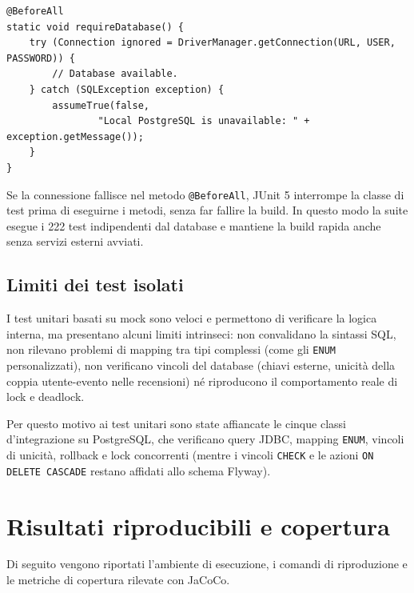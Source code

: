 \begin{lstlisting}[caption={Controllo di disponibilità del database tramite \texttt{Assumptions}.}, label={lst:assume-database}]
@BeforeAll
static void requireDatabase() {
    try (Connection ignored = DriverManager.getConnection(URL, USER, PASSWORD)) {
        // Database available.
    } catch (SQLException exception) {
        assumeTrue(false,
                "Local PostgreSQL is unavailable: " + exception.getMessage());
    }
}
\end{lstlisting}

Se la connessione fallisce nel metodo \texttt{@BeforeAll}, JUnit 5 interrompe la classe di test prima di eseguirne i metodi, senza far fallire la build.
In questo modo la suite esegue i 222 test indipendenti dal database e mantiene la build rapida anche senza servizi esterni avviati.

\subsection{Limiti dei test isolati}
\label{sec:limiti-test-isolati}
I test unitari basati su mock sono veloci e permettono di verificare la logica interna, ma presentano alcuni limiti intrinseci: non convalidano la sintassi SQL, non rilevano problemi di mapping tra tipi complessi (come gli \texttt{ENUM} personalizzati), non verificano vincoli del database (chiavi esterne, unicità della coppia utente-evento nelle recensioni) né riproducono il comportamento reale di lock e deadlock.

Per questo motivo ai test unitari sono state affiancate le cinque classi d'integrazione su PostgreSQL, che verificano query JDBC, mapping \texttt{ENUM}, vincoli di unicità, rollback e lock concorrenti (mentre i vincoli \texttt{CHECK} e le azioni \texttt{ON DELETE CASCADE} restano affidati allo schema Flyway).

\section{Risultati riproducibili e copertura}
\label{sec:test-risultati-copertura}
Di seguito vengono riportati l'ambiente di esecuzione, i comandi di riproduzione e le metriche di copertura rilevate con JaCoCo.

